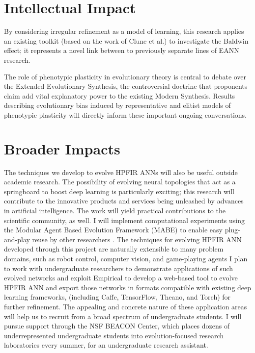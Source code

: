 \section{Intellectual Impact}

By considering irregular refinement as a model of learning, this research applies an existing toolkit (based on the work of Clune et al.) to investigate the Baldwin effect;
it represents a novel link between to previously separate lines of EANN research.\autocite{Clune2011OnRegularity,Downing2010TheNetworks}

The role of phenotypic plasticity in evolutionary theory is central to debate over the Extended Evolutionary Synthesis, the controversial doctrine that proponents claim add vital explanatory power to the existing Modern Synthesis.\autocite{Laland2014DoesRethink}
Results describing evolutionary bias induced by representative and elitist models of phenotypic plasticity will directly inform these important ongoing conversations.

\section{Broader Impacts}

The techniques we develop to evolve HPFIR ANNs will also be useful outside academic research.
The possibility of evolving neural topologies that act as a springboard to boost deep learning is particularly exciting; this research will contribute to the innovative products and services being unleashed by advances in artificial intelligence.
The work will yield practical contributions to the scientific community, as well.
I will implement computational experiments using the Modular Agent Based Evolution Framework (MABE) to enable easy plug-and-play reuse by other researchers \autocite{Hintze2017Mabe}.
The techniques for evolving HPFIR ANN developed through this project are naturally extensible to many problem domains, such as robot control, computer vision, and game-playing agents
I plan to work with undergraduate researchers to demonstrate applications of such evolved networks and exploit Empirical to develop a web-based tool to evolve HPFIR ANN and export those networks in formats compatible with existing deep learning frameworks, (including Caffe, TensorFlow, Theano, and Torch) for further refinement.
The appealing and concrete nature of these application areas will help us to recruit from a broad spectrum of undergraduate students.
I will pursue support through the NSF BEACON Center, which places dozens of underrepresented undergraduate students into evolution-focused research laboratories every summer, for an undergraduate research assistant.
